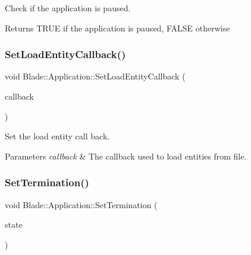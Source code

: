 Check if the application is paused. 

\begin{DoxyReturn}{Returns}
T\+R\+UE if the application is paused, F\+A\+L\+SE otherwise 
\end{DoxyReturn}
\mbox{\label{class_blade_1_1_application_a328d42f7cb14a418ad3b9c54aa055132}} 
\subsubsection{\texorpdfstring{Set\+Load\+Entity\+Callback()}{SetLoadEntityCallback()}}
{\footnotesize\ttfamily void Blade\+::\+Application\+::\+Set\+Load\+Entity\+Callback (\begin{DoxyParamCaption}\item[{const Load\+Entity\+Callback \&}]{callback }\end{DoxyParamCaption})\hspace{0.3cm}{\ttfamily [noexcept]}}



Set the load entity call back. 


\begin{DoxyParams}{Parameters}
{\em callback} & The callback used to load entities from file. \\
\hline
\end{DoxyParams}
\mbox{\label{class_blade_1_1_application_a74d0bed9493b107ac522db1a40ebe19d}} 
\subsubsection{\texorpdfstring{Set\+Termination()}{SetTermination()}}
{\footnotesize\ttfamily void Blade\+::\+Application\+::\+Set\+Termination (\begin{DoxyParamCaption}\item[{bool}]{state }\end{DoxyParamCaption})\hspace{0.3cm}{\ttfamily [noexcept]}}



